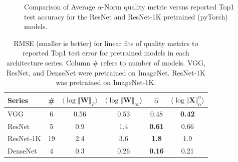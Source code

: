 \begin{figure}[t]
    \centering

    \qquad
    \caption{Comparison of Average $\alpha$-Norm quality metric versus reported Top1 test accuracy for the ResNet and ResNet-1K pretrained (pyTorch) models. 
            }
    \label{fig:cv2-accuracy}
\end{figure}


\begin{table}[t]
\small
\begin{center}
\begin{tabular}{|p{1in}|c|c|c|c|c|}
\hline
 Series    &\#   & $\langle\log\Vert\mathbf{W}\Vert_{F}\rangle$ & $\langle\log\Vert\mathbf{W}\Vert_{\infty}\rangle$ & $\hat{\alpha}$ & $\langle\log\Vert\mathbf{X}\Vert^{\alpha}_{\alpha}\rangle$ \\
\hline
 VGG       &  6 & 0.56 & 0.53 & 0.48          & \textbf{0.42}  \\
 ResNet    &  5 & 0.9  & 1.4  & \textbf{0.61} & 0.66           \\
 ResNet-1K & 19 & 2.4  & 3.6  & \textbf{1.8}  & 1.9            \\
 DenseNet  &  4 & 0.3  & 0.26 & \textbf{0.16} & 0.21           \\
\hline
\end{tabular}
\end{center}
\caption{RMSE (smaller is better) for linear fits of 
         quality metrics to reported Top1 test error for pretrained models in each architecture series.  
         Column \# refers to number of models.  
         VGG, ResNet, and DenseNet were pretrained on ImageNet.  
         ResNet-1K was pretrained on ImageNet-1K. 
}
\label{table:cv-models}
\end{table}

